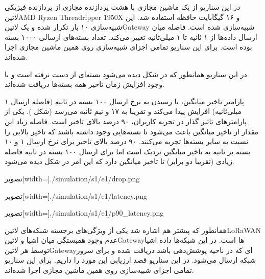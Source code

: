 
در این سناریو از یک ماشین مجازی با هشت پردازنده مجازی از پردازنده فیزیکی
‌لاتین{AMD Ryzen Threadripper 1950X}
و ۱۶ گیگابایت حافظه استفاده شد.
این شبیه‌سازی ۱۰ بار تکرار شده
و یک ‌لاتین{Gateway} شبیه‌سازی شده است. فاصله میان ارسال داده‌ها از ۱ ثانیه تا ۱ میلی‌ثانیه تغییر می‌کند.
تعداد بسته‌های ارسالی ۱۰۰۰ بسته بوده است.
برای این سناریو تمامی اجزای شبیه‌سازی روی همین ماشین مجازی اجرا شده‌اند.

در این سناریو همانطور که در شکل 
دیده می‌شود بسته‌ای از دست نرفته است و با وجود افزایش زمان تاخیر همه بسته‌ها دریافت شده‌اند.

پارامتر تاخیر میانگین، با رسیدن به نرخ ارسال ۱۰۰ بسته در ثانیه (فاصله ارسال ۱ میلی‌ثانیه) افزایش پیدا می‌کند و
تقریبا به ۱۷ و نیم ثانیه می‌رسد (شکل ).
یکی از پارامترهای تاثیر گذار در تجربه کاربران، ۹۰ درصد بالای تاخیر است.
فاصله زیاد این مقدار از تاخیر میانگین باعث می‌شود تا بسته‌هایی وجود داشته باشند که تاخیر بالایی را نسبت به سایر بسته‌ها تجربه می‌کنند.
۹۰ درصد بالای تاخیر برای نرخ ارسال ۱ و ۱۰ بسته بر ثانیه به تاخیر میانگین نزدیک است اما برای ارسال ۱۰۰ بسته در ثانیه فاصله زیادی (تقریبا دو برابر) تا تاخیر میانگین دارد که این امر
در شکل  دیده می‌شود.

‌تصویر[width=\textwidth]{./simulation/s1/e1/drop.png}

‌تصویر[width=\textwidth]{./simulation/s1/e1/latency.png}

‌تصویر[width=\textwidth]{./simulation/s1/e1/p90_latency.png}


همانطور که پیشتر هم اشاره شد یکی از ویژگی‌های برجسته شبکه‌های ‌لاتین{LoRaWAN} عدم وجود
همبستگی میان اشیا و ‌لاتین{Gateway}ها است. در این شبکه‌ها داده اشیا توسط هر ‌لاتین{Gateway}ای
که در ناحیه پوشش‌دهی باشد دریافت شده و برای سرور شبکه ارسال می‌شود.
در این سناریو قصد ارزیابی این مورد را داریم.
برای این سناریو تمامی اجزای شبیه‌سازی روی همین ماشین مجازی اجرا شده‌اند.


